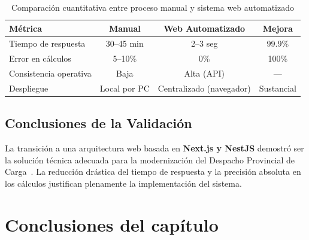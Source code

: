 \begin{table}[H]
\centering
\caption{Comparación cuantitativa entre proceso manual y sistema web automatizado}
\label{tab:comparativa_resultados}
\begin{tabular}{|l|c|c|c|}
\hline
\textbf{Métrica} & \textbf{Manual} & \textbf{Web Automatizado} & \textbf{Mejora} \\ \hline
Tiempo de respuesta & 30--45 min & 2--3 seg & 99.9\% \\ \hline
Error en cálculos & 5--10\% & 0\% & 100\% \\ \hline
Consistencia operativa & Baja & Alta (API) & --- \\ \hline
Despliegue & Local por PC & Centralizado (navegador) & Sustancial \\ \hline
\end{tabular}
\end{table}

\subsection{Conclusiones de la Validación}

La transición a una arquitectura web basada en \textbf{Next.js y NestJS} demostró ser la solución técnica adecuada para la modernización del Despacho Provincial de Carga~\citep{cujae2021}. La reducción drástica del tiempo de respuesta y la precisión absoluta en los cálculos justifican plenamente la implementación del sistema.

\section{Conclusiones del capítulo}

